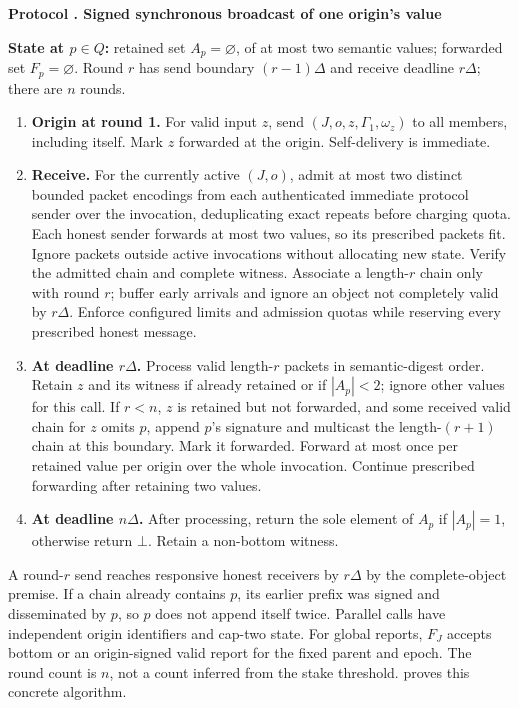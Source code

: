 \documentclass[11pt,a4paper,onecolumn]{article}
\newcommand{\botv}{\bot}
\theoremstyle{remark}\newtheorem{example}[definition]{Example}
\newcounter{protocol}
\newenvironment{protocol}[2]{\refstepcounter{protocol}\label{#1}\begin{mdframed}[nobreak=true,linewidth=.6pt,skipabove=10pt,skipbelow=10pt,innertopmargin=8pt,innerbottommargin=8pt]\small\raggedright\noindent\textbf{Protocol \theprotocol. #2}\par\smallskip}{\end{mdframed}}
\begin{document}
\begin{protocol}{alg:ab}{Signed synchronous broadcast of one origin's value}
\textbf{State at $p\in Q$:} retained set $A_p=\varnothing$, of at most two
semantic values; forwarded set $F_p=\varnothing$. Round $r$ has send boundary
$(r-1)\Delta$ and receive deadline $r\Delta$; there are $n$ rounds.
\begin{enumerate}[label=\textbf{A\arabic*.}]
\item \textbf{Origin at round 1.} For valid input $z$, send
$(J,o,z,\Gamma_1,\omega_z)$ to all members, including itself. Mark $z$ forwarded
at the origin. Self-delivery is immediate.
\item \textbf{Receive.} For the currently active $(J,o)$, admit at most two
distinct bounded packet encodings from each authenticated immediate protocol
sender over the invocation, deduplicating exact repeats before charging quota.
Each honest sender forwards at most two values, so its prescribed packets fit.
Ignore packets outside active invocations without allocating new state.
Verify the admitted chain and complete witness. Associate a
length-$r$ chain only with round $r$; buffer early arrivals and ignore an object
not completely valid by $r\Delta$. Enforce configured limits and admission
quotas while reserving every prescribed honest message.
\item \textbf{At deadline $r\Delta$.} Process valid length-$r$ packets in
semantic-digest order. Retain $z$ and its witness if already retained or if
$|A_p|<2$; ignore other values for this call. If $r<n$, $z$ is retained but not
forwarded, and some received valid chain for $z$ omits $p$, append $p$'s signature
and multicast the length-$(r+1)$ chain at this boundary. Mark it forwarded.
Forward at most once per retained value per origin over the whole invocation.
Continue prescribed forwarding after retaining two values.
\item \textbf{At deadline $n\Delta$.} After processing, return the sole element
of $A_p$ if $|A_p|=1$, otherwise return $\botv$. Retain a non-bottom witness.
\end{enumerate}
\end{protocol}

A round-$r$ send reaches responsive honest receivers by $r\Delta$ by the
complete-object premise. If a chain already contains $p$, its earlier prefix
was signed and disseminated by $p$, so $p$ does not append itself twice.
Parallel calls have independent origin identifiers and cap-two state. For
global reports, $F_J$ accepts bottom or an origin-signed valid report
for the fixed parent and epoch. The round count is $n$, not a count inferred
from the stake threshold.  proves this concrete algorithm.
\end{document}
